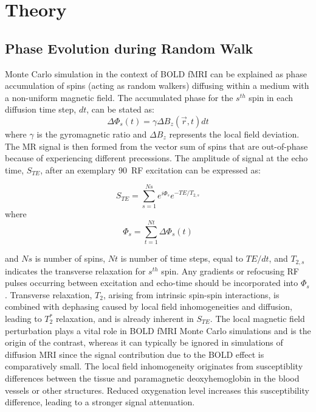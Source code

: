 \section{Theory}

\subsection*{Phase Evolution during Random Walk}
Monte Carlo simulation in the context of BOLD fMRI can be explained as phase accumulation of spins (acting as random walkers) diffusing within a medium with a non-uniform magnetic field. The accumulated phase for the $s^{th}$ spin in each diffusion time step, $dt$, can be stated as:
\begin{equation}
\Delta\Phi_{s}(t) = \gamma\Delta B_{z}(\Vec{r},t) dt
\end{equation}
where $\gamma$ is the gyromagnetic ratio and $\Delta B_{z}$ represents  the local field deviation. The MR signal is then formed from the vector sum of spins that are out-of-phase because of experiencing different precessions. The amplitude of signal at the echo time, $S_{TE}$, after an exemplary 90\textdegree \ RF excitation can be expressed as:

\begin{equation}
S_{TE} = \sum_{s=1}^{Ns}e^{i\Phi_{s}} e^{-TE/T_{2, s}}
\end{equation} where 
\begin{equation}
\Phi_{s} = \sum_{t=1}^{Nt}\Delta\Phi_{s}(t)
\end{equation}

and $Ns$ is number of spins, $Nt$ is number of time steps, equal to $TE/dt$, and $T_{2, s}$ indicates the transverse relaxation for $s^{th}$ spin. Any gradients or refocusing RF pulses occurring between excitation and echo-time should be incorporated into $\Phi_{s}$. Transverse relaxation, \( T_{2} \), arising from intrinsic spin-spin interactions, is combined with dephasing caused by local field inhomogeneities and diffusion, leading to \( T_{2}^* \) relaxation, and is already inherent in \( S_{TE} \). The local magnetic field perturbation plays a vital role in BOLD fMRI Monte Carlo simulations and is the origin of the contrast, whereas it can typically be ignored in simulations of diffusion MRI since the signal contribution due to the BOLD effect is comparatively small. The local field inhomogeneity originates from susceptiblity differences between the tissue and paramagnetic deoxyhemoglobin in the blood vessels or other structures. Reduced oxygenation level increases this susceptibility difference, leading to a stronger signal attenuation.

